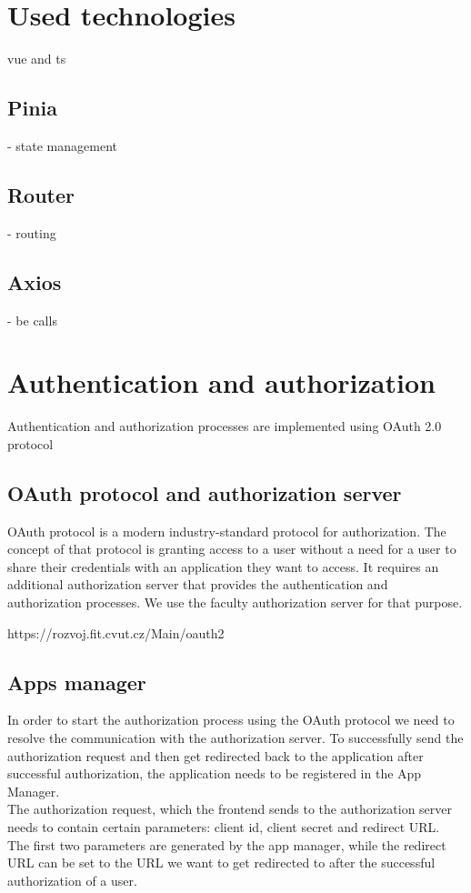 \section{Used technologies} vue and ts

\subsection{Pinia} - state management
\subsection{Router} - routing 
\subsection{Axios} - be calls

\section{Authentication and authorization}
Authentication and authorization processes are implemented using OAuth 2.0 protocol


\subsection{OAuth protocol and authorization server}
OAuth protocol is a modern industry-standard protocol for authorization. The concept of that protocol is granting access to a user without a need for a user to share their credentials with an application they want to access. It requires an additional authorization server that provides the authentication and authorization processes. We use the faculty authorization server for that purpose.

https://rozvoj.fit.cvut.cz/Main/oauth2


\subsection{Apps manager} In order to start the authorization process using the OAuth protocol we need to resolve the communication with the authorization server. To successfully send the authorization request and then get redirected back to the application after successful authorization, the application needs to be registered in the App Manager.\\
The authorization request, which the frontend sends to the authorization server needs to contain certain parameters: client id, client secret and redirect URL. The first two parameters are generated by the app manager, while the redirect URL can be set to the URL we want to get redirected to after the successful authorization of a user.

